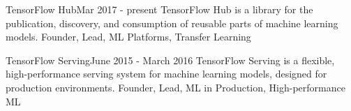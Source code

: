 
\begin{projects}

	\project
	{TensorFlow Hub}{Mar 2017 - present}
	{ 
	}
	{TensorFlow Hub is a library for the publication, discovery, and consumption of reusable parts of machine learning models.}
	{Founder, Lead, ML Platforms, Transfer Learning}

	\project
	{TensorFlow Serving}{June 2015 - March 2016}
	{ 
	}
	{TensorFlow Serving is a flexible, high-performance serving system for machine learning models, designed for production environments.}
	{Founder, Lead, ML in Production, High-performance ML}
\end{projects}